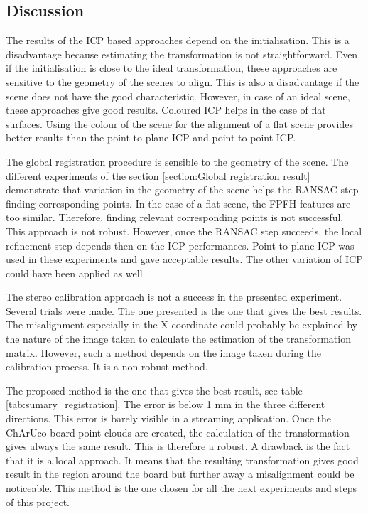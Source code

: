 \subsection{Discussion}

The results of the ICP based approaches depend on the initialisation. This is a disadvantage because estimating the transformation is not straightforward. Even if the initialisation is close to the ideal transformation, these approaches are sensitive to the geometry of the scenes to align. This is also a disadvantage if the scene does not have the good characteristic. However, in case of an ideal scene, these approaches give good results. Coloured ICP helps in the case of flat surfaces. Using the colour of the scene for the alignment of a flat scene provides better results than the point-to-plane ICP and point-to-point ICP.

The global registration procedure is sensible to the geometry of the scene. The different experiments of the section \ref{section:Global registration result} demonstrate that variation in the geometry of the scene helps the RANSAC step finding corresponding points. In the case of a flat scene, the FPFH features are too similar. Therefore, finding relevant corresponding points is not successful. This approach is not robust. However, once the RANSAC step succeeds, the local refinement step depends then on the ICP performances. Point-to-plane ICP was used in these experiments and gave acceptable results. The other variation of ICP could have been applied as well.

The stereo calibration approach is not a success in the presented experiment. Several trials were made. The one presented is the one that gives the best results. The misalignment especially in the X-coordinate could probably be explained by the nature of the image taken to calculate the estimation of the transformation matrix. However, such a method depends on the image taken during the calibration process. It is a non-robust method.

The proposed method is the one that gives the best result, see table \ref{tab:sumary_registration}. The error is below 1 mm in the three different directions. This error is barely visible in a streaming application. Once the ChArUco board point clouds are created, the calculation of the transformation gives always the same result. This is  therefore a robust. 
A drawback is the fact that it is a local approach. It means that the resulting transformation gives good result in the region around the board but further away a misalignment could be noticeable. This method is the one chosen for all the next experiments and steps of this project. 

